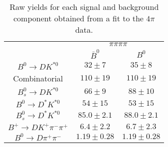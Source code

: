 \begin{table}
  \centering
  \begin{tabular}{ccc}
      \toprule
       & \multicolumn{2}{c}{$\pi\pi\pi\pi$} \\
      & $\bar{B}^0$ & $B^0$ \\
      \midrule
      $B^0 \to DK^{*0}$ & $32 \pm 7$ & $35 \pm 8$ \\
      Combinatorial & $110 \pm 19$ & $110 \pm 19$ \\
      $B^0_s \to DK^{*0}$ & $66 \pm 9$ & $88 \pm 10$ \\
      $B^0 \to D^*K^{*0}$ & $54 \pm 15$ & $53 \pm 15$ \\
      $B^0_s \to D^*K^{*0}$ & $85.0 \pm 2.1$ & $88.0 \pm 2.1$ \\
      $B^+ \to DK^+\pi^-\pi^+$ & $6.4 \pm 2.2$ & $6.7 \pm 2.3$ \\
      $B^0 \to D\pi^+\pi^-$ & $1.19 \pm 0.28$ & $1.19 \pm 0.28$ \\
      \bottomrule
      \end{tabular}
\caption{Raw yields for each signal and background component obtained from a fit to the $4\pi$ data.}
\label{tab:yields_split_4pi}
\end{table}
